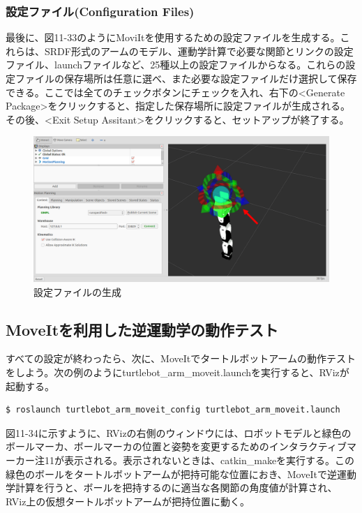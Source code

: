 \subsubsection{設定ファイル(Configuration Files)}

最後に、図11-33のようにMoviItを使用するための設定ファイルを生成する。これらは、SRDF形式のアームのモデル、運動学計算で必要な関節とリンクの設定ファイル、launchファイルなど、25種以上の設定ファイルからなる。これらの設定ファイルの保存場所は任意に選べ、また必要な設定ファイルだけ選択して保存できる。ここでは全てのチェックボタンにチェックを入れ、右下の<Generate Package>をクリックすると、指定した保存場所に設定ファイルが生成される。その後、<Exit Setup Assitant>をクリックすると、セットアップが終了する。

\begin{figure}[ht]
  \centering
  \includegraphics[width=\columnwidth]{pictures/chapter11/pic_11_33.png}
  \caption{設定ファイルの生成}
\end{figure}

\subsection{MoveItを利用した逆運動学の動作テスト}

すべての設定が終わったら、次に、MoveItでタートルボットアームの動作テストをしよう。次の例のようにturtlebot\_arm\_moveit.launchを実行すると、RVizが起動する。

\begin{lstlisting}[language=ROS]
$ roslaunch turtlebot_arm_moveit_config turtlebot_arm_moveit.launch
\end{lstlisting}

図11-34に示すように、RVizの右側のウィンドウには、ロボットモデルと緑色のボールマーカ、ボールマーカの位置と姿勢を変更するためのインタラクティブマーカー注11が表示される。表示されないときは、catkin\_makeを実行する。この緑色のボールをタートルボットアームが把持可能な位置におき、MoveItで逆運動学計算を行うと、ボールを把持するのに適当な各関節の角度値が計算され、RViz上の仮想タートルボットアームが把持位置に動く。

